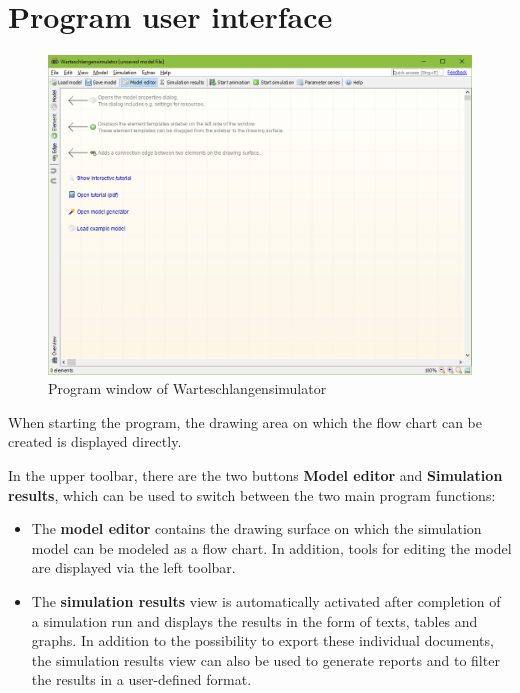\documentclass{svmono}
\begin{document}
\chapter{Program user interface}

\begin{figure}[h]	
	\caption{Program window of Warteschlangensimulator}
	\centerline{\includegraphics[width=14cm]{ProgramWindow.png}}
	\label{fig:ProgramWindow}
\end{figure}

When starting the program, the drawing area on which the flow chart can be created is displayed directly.

In the upper toolbar, there are the two buttons \textbf{Model editor} and \textbf{Simulation results}, which can be used to switch between the two main program functions:

\begin{itemize}
\item
The \textbf{model editor} contains the drawing surface on which the simulation model can be modeled as a flow chart. In addition, tools for editing the model are displayed via the left toolbar.
\item
The \textbf{simulation results} view is automatically activated after completion of a simulation run and displays the results in the form of texts, tables and graphs. In addition to the possibility to export these individual documents, the simulation results view can also be used to generate reports and to filter the results in a user-defined format.
\end{itemize}
\end{document}
